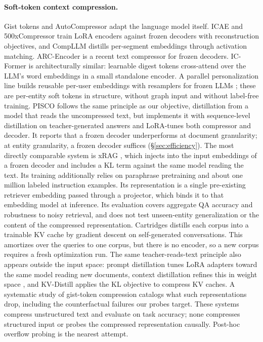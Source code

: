 \documentclass{article}
\begin{document}
\paragraph{Soft-token context compression.} Gist tokens \citep{gist} and AutoCompressor
\citep{autocompressor} adapt the language model itself. ICAE \citep{icae} and 500xCompressor
\citep{fivehundredx} train LoRA encoders against frozen decoders with reconstruction
objectives, and CompLLM \citep{compllm} distills per-segment embeddings through activation
matching. ARC-Encoder \citep{arcencoder} is a recent text compressor for frozen
decoders. IC-Former \citep{icformer} is architecturally similar: learnable
digest tokens cross-attend over the LLM's word embeddings in a small standalone encoder. A
parallel personalization line builds reusable per-user embeddings with resamplers for frozen
LLMs \citep{userllm,persoma}; these are per-entity soft tokens in structure, without graph
input and without label-free training. PISCO \citep{pisco} follows the same principle as our
objective, distillation from
a model that reads the uncompressed text, but implements it with sequence-level distillation
on teacher-generated answers and LoRA-tunes both compressor and decoder. It reports that a
frozen decoder underperforms at document granularity; at entity granularity, a frozen decoder
suffices (\S\ref{sec:efficiency}). The most directly comparable system is xRAG \citep{xrag}, which injects into the
input embeddings of a frozen decoder and includes a KL term against the same model reading
the text. Its training additionally relies on paraphrase pretraining and about one million
labeled instruction examples. Its representation is a single pre-existing retriever embedding
passed through a projector, which binds it to that embedding model at inference. Its
evaluation covers aggregate QA accuracy and robustness to noisy retrieval, and does not test
unseen-entity generalization or the content of the compressed representation.
Cartridges \citep{cartridges} distills each corpus into a trainable KV cache by gradient
descent on self-generated conversations. This amortizes over the queries to one corpus, but
there is no encoder, so a new corpus requires a fresh optimization run. The same
teacher-reads-text principle also appears outside the input space: prompt distillation
\citep{promptdistill} tunes LoRA adapters toward the same model reading new documents,
context distillation refines this in weight space \citep{disc}, and KV-Distill
\citep{kvdistill} applies the KL objective to compress KV caches. A systematic study of
gist-token compression \citep{gistsurvey} catalogs what such representations drop, including
the counterfactual failures our probes target. These systems compress unstructured text and
evaluate on task accuracy; none compresses structured input or probes the compressed
representation causally. Post-hoc overflow probing
\citep{overflow} is the nearest attempt.
\end{document}
